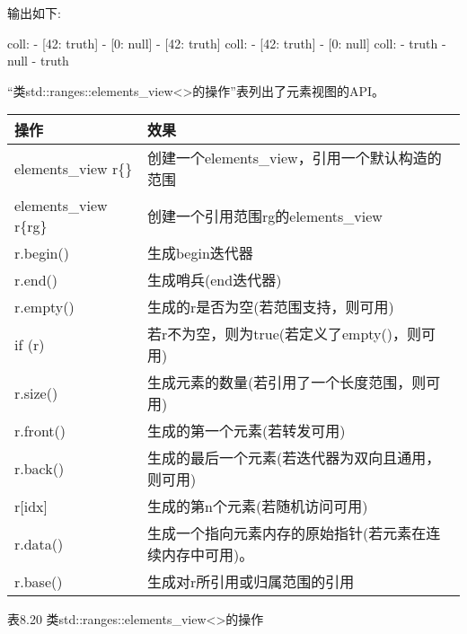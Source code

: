 输出如下:

\begin{shell}
coll:
- [42: truth]
- [0: null]
- [42: truth]
coll:
- [42: truth]
- [0: null]
coll:
- truth
- null
- truth
\end{shell}


“类std::ranges::elements\_view<>的操作”表列出了元素视图的API。

\begin{longtable}[c]{|l|l|}
\hline
\textbf{操作}     & \textbf{效果}                                                \\ \hline
\endfirsthead
%
\endhead
%
elements\_view r\{\} & 创建一个elements\_view，引用一个默认构造的范围                               \\ \hline
elements\_view r\{rg\} & 创建一个引用范围rg的elements\_view              \\ \hline
r.begin()              & 生成begin迭代器                                      \\ \hline
r.end()                & 生成哨兵(end迭代器)                             \\ \hline
r.empty()              & 生成的r是否为空(若范围支持，则可用) \\ \hline
if (r)                 & 若r不为空，则为true(若定义了empty()，则可用)        \\ \hline
r.size()             & 生成元素的数量(若引用了一个长度范围，则可用)                             \\ \hline
r.front()              & 生成的第一个元素(若转发可用)              \\ \hline
r.back()               & 生成的最后一个元素(若迭代器为双向且通用，则可用) \\ \hline
r{[}idx{]}             & 生成的第n个元素(若随机访问可用)            \\ \hline
r.data()             & 生成一个指向元素内存的原始指针(若元素在连续内存中可用)。 \\ \hline
r.base()               & 生成对r所引用或归属范围的引用       \\ \hline
\end{longtable}

\begin{center}
表8.20 类std::ranges::elements\_view<>的操作
\end{center}

